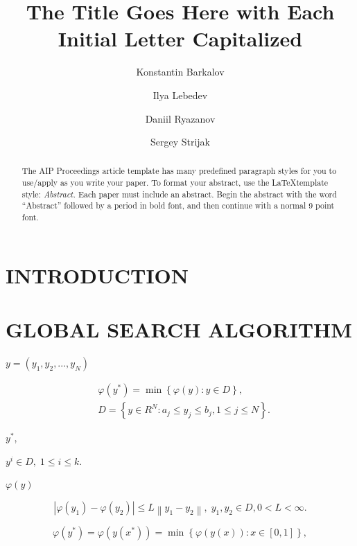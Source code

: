\documentclass{aip-cp}
\begin{document}
\title{The Title Goes Here with Each Initial Letter Capitalized}

\author[aff1]{Konstantin Barkalov}
\author[aff1]{Ilya Lebedev}
\author[aff2]{Daniil Ryazanov}
\author[aff2]{Sergey Strijak}


\maketitle

\begin{abstract}
The AIP Proceedings article template has many predefined paragraph styles for you to use/apply as you write your paper. To format your abstract, use the \LaTeX template style: {\itshape Abstract.} Each paper must include an abstract. Begin the abstract with the word ``Abstract'' followed by a period in bold font, and then continue with a normal 9 point font.
\end{abstract}

\section{INTRODUCTION}


\section{GLOBAL SEARCH ALGORITHM}

$y=(y_1,y_2,...,y_N)$

\begin{eqnarray}\label{problem}
&\varphi(y^\ast)=\min{\left\{\varphi(y):y\in D\right\}},\\
&D=\left\{y\in R^N: a_j\leq y_j \leq b_j, 1\leq j \leq N \right\}.\label{D}
\end{eqnarray}

$y^*$,

$y^i\in D, \; 1 \leq i \leq k$.

$\varphi(y)$

\[
\left|\varphi(y_1)-\varphi(y_2)\right|\leq L\left\|y_1-y_2\right\|,\; y_1,y_2 \in D, 0<L<\infty.
\]

\[
\varphi(y^\ast)=\varphi(y(x^\ast))=\min{\left\{\varphi(y(x)): x\in[0,1]\right\}},
\]
\end{document}
